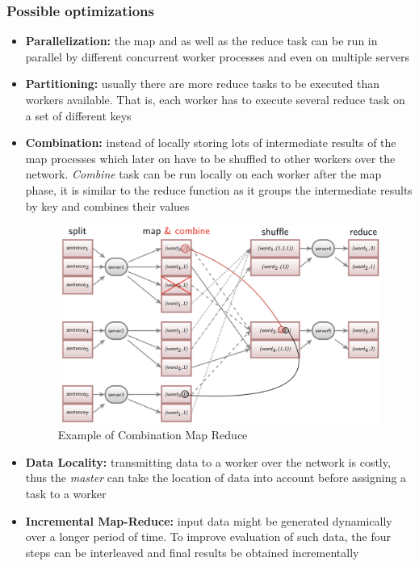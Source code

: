 \subsubsection{Possible optimizations}
\begin{itemize}
    \item \textbf{Parallelization:} the map and as well as the reduce task can be run in parallel by different concurrent worker processes and even on multiple servers
    \item \textbf{Partitioning:} usually there are more reduce tasks to be executed than workers available. That is, each worker has to execute several reduce task on a set of different keys
    
    \newpage
    
    \item \textbf{Combination:} instead of locally storing lots of intermediate results of the map processes which later on have to be shuffled to other workers over the network. \textit{Combine} task can be run locally on each worker after the map phase, it  is similar to the reduce function as it groups the intermediate results by key and combines their values
    
    \begin{figure}[!hbp]
        \centering
        \includegraphics[width=0.70\linewidth]{images/AdvancedDataManagment/key_value_store/combination.jpeg}
        \caption{Example of Combination Map Reduce}
    \end{figure}
    
    \item \textbf{Data Locality:} transmitting data to a worker over the network is costly, thus the \textit{master} can take the location of data into account before assigning a task to a worker
    \item \textbf{Incremental Map-Reduce:} input data might be generated dynamically over a longer period of time. To improve evaluation of such data, the four steps can be interleaved and final results be obtained incrementally
\end{itemize}